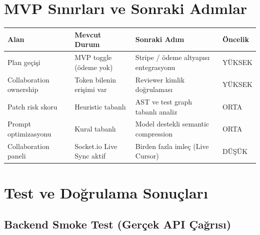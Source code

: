 \documentclass[11pt,a4paper]{article}
\begin{document}
\section{MVP Sınırları ve Sonraki Adımlar}

\begin{tabularx}{\textwidth}{@{} L{2.8cm} L{3.2cm} L{3.8cm} L{1.8cm} @{}}
\toprule
\textbf{Alan} & \textbf{Mevcut Durum} & \textbf{Sonraki Adım} & \textbf{Öncelik} \\
\midrule
Plan geçişi & MVP toggle (ödeme yok) & Stripe / ödeme altyapısı entegrasyonu & YÜKSEK \\
\addlinespace
Collaboration ownership & Token bilenin erişimi var & Reviewer kimlik doğrulaması & YÜKSEK \\
\addlinespace
Patch risk skoru & Heuristic tabanlı & AST ve test graph tabanlı analiz & ORTA \\
\addlinespace
Prompt optimizasyonu & Kural tabanlı & Model destekli semantic compression & ORTA \\
\addlinespace
Collaboration paneli & Socket.io Live Sync aktif & Birden fazla imleç (Live Cursor) & DÜŞÜK \\
\bottomrule
\end{tabularx}

\section{Test ve Doğrulama Sonuçları}

\subsection{Backend Smoke Test (Gerçek API Çağrısı)}
\end{document}
